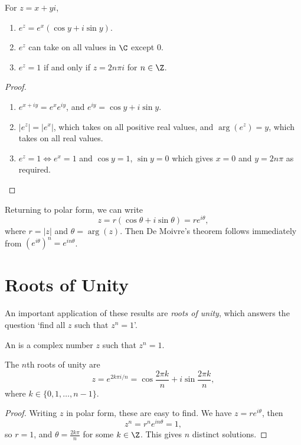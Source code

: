 \documentclass[a4paper]{scrreprt}
\begin{document}
\begin{proposition}
	For $z = x + yi$,
	\begin{enumerate}[label=(\roman*)]
		\item $e^z = e^x(\cos y + i \sin y)$.
		\item $e^z$ can take on all values in $\C$ except 0.
		\item $e^z = 1$ if and only if $z = 2 n \pi i$ for $n \in \Z$. 
	\end{enumerate}
\end{proposition}
\begin{proof}\begin{enumerate}[label=(\roman*)]
	\item $e^{x + iy} = e^x e^{iy}$, and $e^{iy} = \cos y + i \sin y$.
	\item $|e^z| = |e^x|$, which takes on all positive real values, and $\arg(e^z) = y$, which takes on all real values.
	\item $e^z = 1 \iff e^x = 1$ and $\cos y = 1$, $\sin y = 0$ which gives $x = 0$ and $y = 2 n \pi$ as required. \qedhere
\end{enumerate}
\end{proof}

Returning to polar form, we can write
$$
z = r(\cos \theta + i \sin \theta) = re^{i \theta},
$$
where $r = |z|$ and $\theta = \arg(z)$. 
Then De Moivre's theorem follows immediately from $(e^{i \theta})^n = e^{i n \theta}$.


\section{Roots of Unity}

An important application of these results are \emph{roots of unity}, which answers the question `find all $z$ such that $z^n = 1$'.

\begin{definition}
	An  is a complex number $z$ such that $z^n = 1$.
\end{definition}

\begin{proposition}
	The $n$th roots of unity are
	$$
	z = e^{2 k \pi i / n} = \cos \frac{2 \pi k}{n}+ i \sin \frac{2 \pi k}{n},
	$$
	where $k \in \{0, 1, \dots, n - 1\}$.
\end{proposition}
\begin{proof}
	Writing $z$ in polar form, these are easy to find. We have $z = re^{i \theta}$, then
$$
z^n = r^n e^{i n \theta} = 1,
$$
so $r = 1$, and $\theta = \frac{2 k \pi}{n}$ for some $k \in \Z$. This gives $n$ distinct solutions.
\end{proof}
\end{document}
